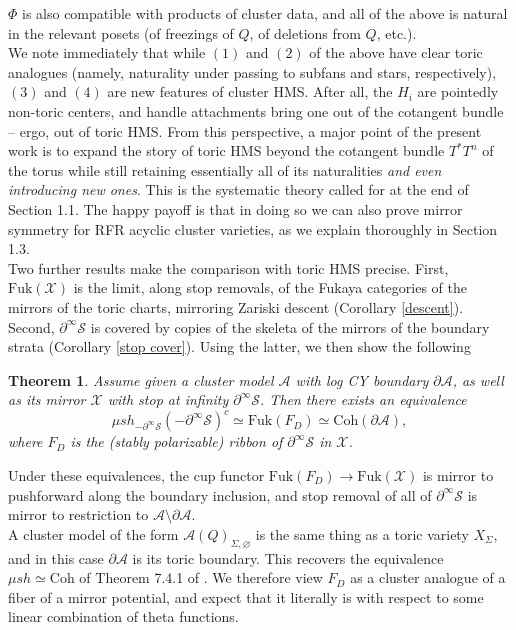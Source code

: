 \documentclass[11pt]{amsart}
\newtheorem{thm}{Theorem}[section]
\theoremstyle{definition}
\theoremstyle{remark}
\newcommand{\A}{\mathcal{A}}
\newcommand{\X}{\mathcal{X}}
\newcommand{\Coh}{\mathrm{Coh}}
\newcommand{\Fuk}{\mathrm{Fuk}}
\renewcommand{\emptyset}{\varnothing}
\numberwithin{equation}{section}
\begin{document}
$\Phi$ is also compatible with products of cluster data, and all of the above is natural in the relevant posets (of freezings of $Q$, of deletions from $Q$, etc.).\\

We note immediately that while $(1)$ and $(2)$ of the above have clear toric analogues (namely, naturality under passing to subfans and stars, respectively), $(3)$ and $(4)$ are new features of cluster HMS. After all, the $H_i$ are pointedly non-toric centers, and handle attachments bring one out of the cotangent bundle -- ergo, out of toric HMS. From this perspective, a major point of the present work is to expand the story of toric HMS beyond the cotangent bundle $T^* T^n$ of the torus while still retaining essentially all of its naturalities \textit{and even introducing new ones}. This is the systematic theory called for at the end of Section 1.1. The happy payoff is that in doing so we can also prove mirror symmetry for RFR acyclic cluster varieties, as we explain thoroughly in Section 1.3.\\

Two further results make the comparison with toric HMS precise. First, $\Fuk(\mathcal{X})$ is the limit, along stop removals, of the Fukaya categories of the mirrors of the toric charts, mirroring Zariski descent (Corollary \ref{descent}). Second, $\partial^\infty\mathcal{S}$ is covered by copies of the skeleta of the mirrors of the boundary strata (Corollary \ref{stop cover}). Using the latter, we then show the following

\begin{thm}
    Assume given a cluster model $\A$ with log CY boundary $\partial \A$, as well as its mirror $\X$ with stop at infinity $\partial^\infty \mathcal{S}$. Then there exists an equivalence $$\mu sh_{-\partial^\infty\mathcal{S}}(\mathcal{-\partial^\infty S})^c \simeq \Fuk(F_D) \simeq \Coh(\partial\mathcal{A}),$$ \noindent where $F_D$ is the (stably polarizable) ribbon of $\partial^\infty \mathcal{S}$ in $\X$.
\end{thm}

Under these equivalences, the cup functor $\Fuk(F_D) \to \Fuk(\X)$ is mirror to pushforward along the boundary inclusion, and stop removal of all of $\partial^\infty \mathcal{S}$ is mirror to restriction to $\A \setminus \partial \A$.\\

A cluster model of the form $\mathcal{A}(Q)_{\Sigma, \emptyset}$ is the same thing as a toric variety $X_\Sigma$, and in this case $\partial\mathcal{A}$ is its toric boundary. This recovers the equivalence $\mu sh \simeq \Coh$ of Theorem 7.4.1 of \cite{gammage2022mirror}. We therefore view $F_D$ as a cluster analogue of a fiber of a mirror potential, and expect that it literally is with respect to some linear combination of theta functions.\\
\end{document}
